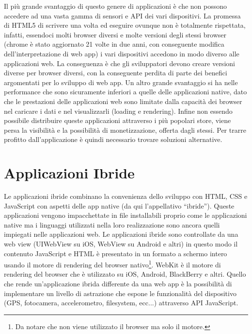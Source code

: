 		Il più grande svantaggio di questo genere di applicazioni è che non 
		possono accedere ad una vasta gamma di sensori e API dei vari 
		dispositivi. La promessa di HTML5 di scrivere una volta ed eseguire 
		ovunque non è totalmente rispettata, infatti, essendoci molti browser 
		diversi e molte versioni degli stessi browser (chrome è stato aggiornato 
		21 volte in due anni, con conseguente modifica dell'interpretazione di 
		web app)\citep{White:Native-vs-Html} i vari dispositivi accedono in modo 
		diverso alle applicazioni web. La conseguenza è che gli sviluppatori 
		devono creare versioni diverse per browser diversi, con la conseguente 
		perdita di parte dei benefici argomentati per lo sviluppo di web app. Un 
		altro grande svantaggio si ha nelle performance che sono sicuramente 
		inferiori a quelle delle applicazioni native, dato che le prestazioni 
		delle applicazioni web sono limitate dalla capacità dei browser nel 
		caricare i dati e nel visualizzarli (loading e rendering). Infine non 
		essendo possibile distribuire queste applicazioni attraverso i più 
		popolari store, viene persa la visibilità e la possibilità di 
		monetizzazione, offerta dagli stessi. Per trarre profitto 
		dall'applicazione è quindi necessario trovare soluzioni alternative.
		
	\section{Applicazioni Ibride}
		Le applicazioni ibride combinano la convenienza dello sviluppo con HTML, 
		CSS e JavaScript con aspetti delle app native (da qui l'appellativo 
		``ibride''). Queste applicazioni vengono impacchettate in file 
		installabili proprio come le applicazioni native ma i linguaggi 
		utilizzati nella loro realizzazione sono ancora quelli impiegati nelle 
		applicazioni web. Le applicazioni ibride sono controllate da una web 
		view (UIWebView su iOS, WebView su Android e altri) in questo modo il 
		contenuto JavaScript e HTML è  presentato in un formato a schermo 
		intero usando il motore di rendering del browser nativo\footnote{Da 
		notare che non viene utilizzato il browser ma solo il motore.}. WebKit è 
		il motore di rendering del browser che è utilizzato su iOS, Android, 
		BlackBerry e altri. Quello che rende un'applicazione ibrida differente 
		da una web app è la possibilità di implementare un livello di astrazione 
		che espone le funzionalità del dispositivo (GPS, fotocamera, 
		accelerometro, filesystem, ecc...) attraverso API JavaScript.
		
